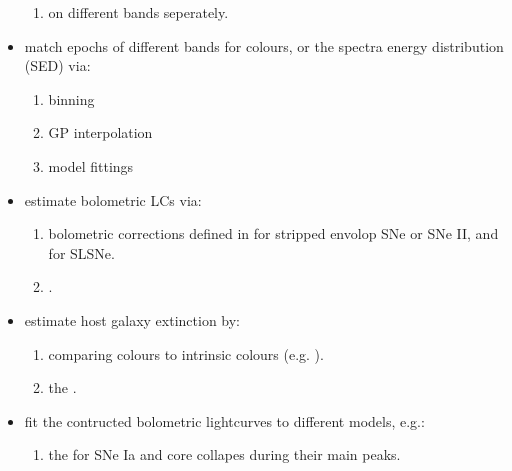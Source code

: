 \documentclass[letterpaper,10pt,english]{sphinxmanual}
\begin{document}
\begin{itemize}
\begin{enumerate}
\item {} 
on different bands seperately.

\end{enumerate}

\item {} 
match epochs of different bands for colours, or the spectra energy distribution (SED) via:
\begin{enumerate}
%
\item {} 
binning

\item {} 
GP interpolation

\item {} 
model fittings

\end{enumerate}

\item {} 
estimate bolometric LCs via:
\begin{enumerate}
%
\item {} 
bolometric corrections defined in  for stripped envolop SNe or SNe II, and  for SLSNe.

\item {} 
.

\end{enumerate}

\item {} 
estimate host galaxy extinction by:
\begin{enumerate}
%
\item {} 
comparing colours to intrinsic colours (e.g. ).

\item {} 
the .

\end{enumerate}

\item {} 
fit the contructed bolometric lightcurves to different models, e.g.:
\begin{enumerate}
%
\item {} 
the  for SNe Ia and core collapes during their main peaks.


\end{enumerate}
\end{itemize}
\end{document}

